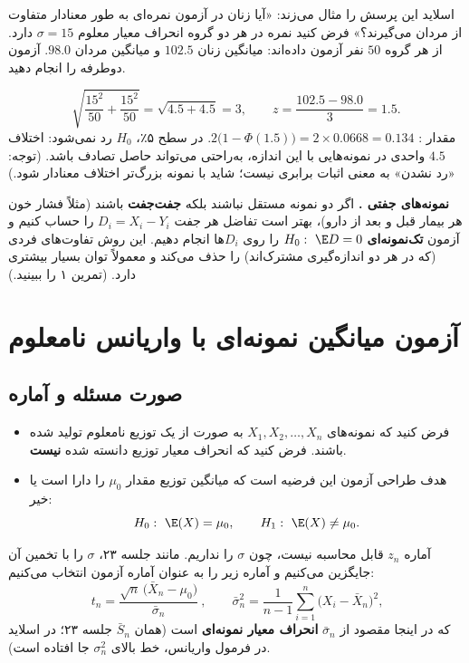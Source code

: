 \begin{example}
اسلاید این پرسش را مثال می‌زند: «آیا زنان در آزمون  نمره‌ای به طور معنادار متفاوت از مردان می‌گیرند؟» فرض کنید نمره  در هر دو گروه انحراف معیار معلوم $\sigma=15$ دارد. از هر گروه $50$ نفر آزمون داده‌اند: میانگین زنان $102.5$ و میانگین مردان $98.0$. آزمون دوطرفه را انجام دهید.
\begin{solution}
\[
\sqrt{\frac{15^2}{50}+\frac{15^2}{50}}=\sqrt{4.5+4.5}=3,\qquad z=\frac{102.5-98.0}{3}=1.5 .
\]
مقدار : $2\big(1-\Phi(1.5)\big)=2\times0.0668=0.134$. در سطح ۵٪، $H_0$ رد نمی‌شود: اختلاف $4.5$ واحدی در نمونه‌هایی با این اندازه، به‌راحتی می‌تواند حاصل تصادف باشد. (توجه: «رد نشدن» به معنی اثبات برابری نیست؛ شاید با نمونه بزرگ‌تر اختلاف معنادار شود.)
\end{solution}
\end{example}

\begin{note}
\notetitle \textbf{نمونه‌های جفتی .} اگر دو نمونه مستقل نباشند بلکه \textbf{جفت‌جفت} باشند (مثلاً فشار خون هر بیمار قبل و بعد از دارو)، بهتر است تفاضل هر جفت $D_i=X_i-Y_i$ را حساب کنیم و آزمون \textbf{تک‌نمونه‌ای} $H_0:\ \E D=0$ را روی $D_i$ها انجام دهیم. این روش تفاوت‌های فردی (که در هر دو اندازه‌گیری مشترک‌اند) را حذف می‌کند و معمولاً توان بسیار بیشتری دارد. (تمرین ۱ را ببینید.)
\end{note}

\section{آزمون میانگین نمونه‌ای با واریانس نامعلوم }

\subsection{صورت مسئله و آماره}
\begin{itemize}
\item فرض کنید که نمونه‌های $X_1,X_2,\ldots,X_n$ به صورت  از یک توزیع نامعلوم تولید شده باشند. فرض کنید که انحراف معیار توزیع دانسته شده \textbf{نیست}.
\item هدف طراحی آزمون این فرضیه است که میانگین توزیع مقدار $\mu_0$ را دارا است یا خیر:
\[
H_0:\ \E(X)=\mu_0,\qquad H_1:\ \E(X)\neq\mu_0 .
\]
\end{itemize}
آماره $z_n$ قابل محاسبه نیست، چون $\sigma$ را نداریم. مانند جلسه ۲۳، $\sigma$ را با تخمین آن جایگزین می‌کنیم و آماره زیر را به عنوان آماره آزمون انتخاب می‌کنیم:
\[
\boxed{\ t_n=\frac{\sqrt n\,\big(\bar X_n-\mu_0\big)}{\bar\sigma_n}\ },\qquad
\bar\sigma_n^2=\frac{1}{n-1}\sum_{i=1}^n\big(X_i-\bar X_n\big)^2,
\]
که در اینجا مقصود از $\bar\sigma_n$ \textbf{انحراف معیار نمونه‌ای} است (همان $\bar S_n$ جلسه ۲۳؛ در اسلاید در فرمول واریانس، خط بالای $\sigma_n^2$ جا افتاده است).

